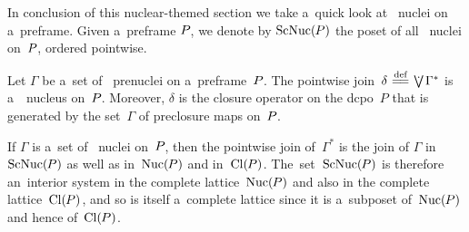 \documentclass[11pt,letterpaper]{article}
\renewcommand{\thmskip}{\bigskip}
\begin{document}
\begin{comment}
In the proof above
we use the assumption that every $\gamma\in\Gamma$ is a~nucleus,
but we do not need $\beta$ to be a~nucleus, it suffices that $\beta$ is a~closure operator.
So we have actually proved the following, albeit rather technical,
	enhancement of Proposition~\ref{prop:frame-of-nuclei-on-preframe}:

\thmskip

\begin{proposition}\label{prop:frame-of-nuclei-on-preframes-enhanced}
If\/ $P$ is a~preframe,
$\beta$ is a~closure operator on\/~$P$,
and\/ $\Gamma$ is a~set of nuclei on\/~$P$,
then
%
\begin{equation*}
\beta \meet \tJoin\negdtinysp\Gamma \Eq \tJoin_{\!\gamma\in\Gamma}\tinysp(\beta\meet\gamma)~,
\end{equation*}
%
with the binary meets and the joins taken in the complete lattice\/~$\Cl(\negtinysp P)$.
\end{proposition}

\thmskip

The binary meets are of course calculated pointwise,
and the join $\tJoin\negdtinysp\Gamma$, though taken in $\Cl(\negtinysp P)$, is actually a~nucleus.

I~do not know whether there is any interesting application
	for the Proposition~\ref{prop:frame-of-nuclei-on-preframes-enhanced}.
Well, perhaps somebody out there will find in this proposition
the missing link for her/his proof that has been languishing unfinished for a~long time.

\txtskip
\end{comment}

In conclusion of this nuclear-themed section we take a~quick look at \Scottcont\ nuclei on a~preframe.
Given a~preframe $P\mspace{-1mu}$, we denote by $\mathop{\smash{\mathrm{ScNuc}}}\nolimits(\mspace{-1mu} P)$
	the poset of all \Scottcont\ nuclei on~$P\mspace{-1mu}$, ordered pointwise.

\thmskip

\begin{theorem}\label{thm:in-preframe-nuc-generd-by-prenucs}
Let\/ $\Gamma$ be a~set of \Scottcont\ prenuclei on a~preframe\/~$P\mspace{-1mu}$.
The pointwise join\/~$\delta\defeq\dottJoin\negtinysp\Gamma^*$
	is a~\Scottcont\ nucleus on\/~$P\mspace{-1mu}$.
Moreover, $\delta$ is the closure operator on the dcpo\/~$P$
	that is generated by the set\/~$\Gamma$ of preclosure maps on\/~$P\mspace{-1mu}$.

If\/ $\Gamma$ is a~set of \Scottcont\ nuclei on\/~$P\mspace{-1mu}$,
then the pointwise join of\/~$\Gamma^*$
is the join of\/ $\Gamma$ in\/~$\mathop{\smash{\mathrm{ScNuc}}}\nolimits(\mspace{-1mu} P)$
	as well as in\/~$\mathop{\smash{\mathrm{Nuc}}}\nolimits(\mspace{-1mu} P)$ and in\/~$\mathop{\smash{\mathrm{Cl}}}\nolimits(\mspace{-1mu} P)\mspace{1mu}$.
The~set\/~$\mspace{1mu}\mathop{\smash{\mathrm{ScNuc}}}\nolimits(\mspace{-1mu} P)$ is therefore
	an~interior system in the complete lattice\/~$\mathop{\smash{\mathrm{Nuc}}}\nolimits(\mspace{-1mu} P)$
		and also in the complete lattice\/~$\mathop{\smash{\mathrm{Cl}}}\nolimits(\mspace{-1mu} P)\mspace{1mu}$,
and so is itself a~complete lattice
	since it is a~subposet of\/~$\mathop{\smash{\mathrm{Nuc}}}\nolimits(\mspace{-1mu} P)$ and hence of\/~$\mathop{\smash{\mathrm{Cl}}}\nolimits(\mspace{-1mu} P)$.
\end{theorem}
\end{document}
